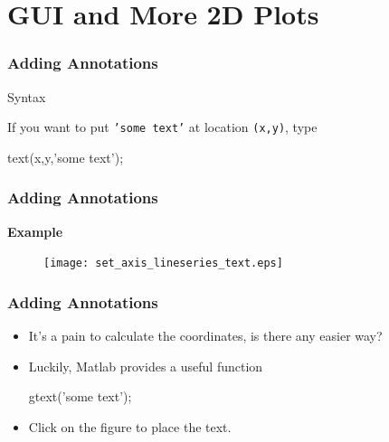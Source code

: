 \documentclass[compress]{beamer}  %
\begin{document}
\section{GUI and More 2D Plots}
\begin{frame}[fragile]
\frametitle{Adding Annotations}

\begin{block}{Syntax}

If you want to put \texttt{'some text'} at location \texttt{(x,y)}, type
\begin{matlabcodebeamer}[numbers=none,frame=none]
          text(x,y,'some text');
\end{matlabcodebeamer}
\end{block}

\end{frame}
\begin{frame}[fragile]
\frametitle{Adding Annotations}
\textbf{Example} 

\setcounter{subfigure}{0}
\begin{figure}
    \centering
    \texttt{[image: set\_axis\_lineseries\_text.eps]}
\end{figure}

\end{frame}
\begin{frame}[fragile]
\frametitle{Adding Annotations}
\begin{itemize}[<+->]
    \item It's a pain to calculate the coordinates, is there any easier way?
    
    \item Luckily, Matlab provides a useful function
          \begin{matlabcode}[numbers=none,frame=none]
          gtext('some text');
          \end{matlabcode}

    \item Click on the figure to place the text.
\end{itemize}

\end{frame}
\end{document}
